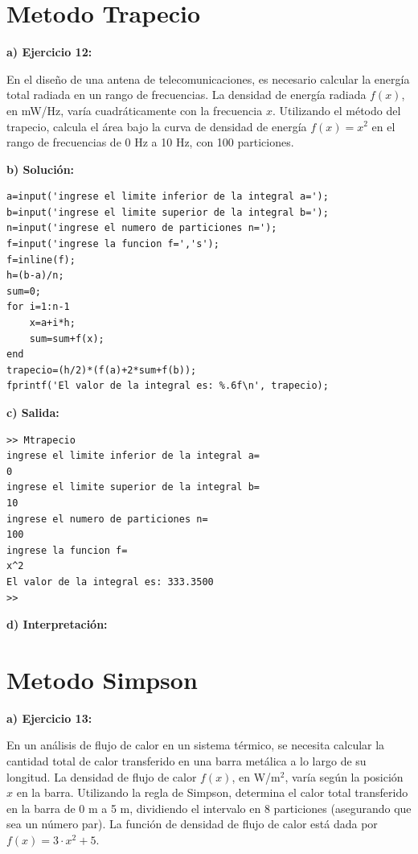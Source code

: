 \documentclass[12pt,a4paper,twoside]{article}  %
\begin{document}
\section{Metodo Trapecio}

\textbf{a) Ejercicio 12: }

En el diseño de una antena de telecomunicaciones, es necesario calcular la energía total radiada en un rango de frecuencias. La densidad de energía radiada \( f(x) \), en mW/Hz, varía cuadráticamente con la frecuencia \( x \). Utilizando el método del trapecio, calcula el área bajo la curva de densidad de energía \( f(x) = x^2 \) en el rango de frecuencias de 0 Hz a 10 Hz, con 100 particiones.

\textbf{b) Solución:}

\begin{lstlisting}
a=input('ingrese el limite inferior de la integral a=');
b=input('ingrese el limite superior de la integral b=');
n=input('ingrese el numero de particiones n=');
f=input('ingrese la funcion f=','s');
f=inline(f);
h=(b-a)/n;
sum=0;
for i=1:n-1
    x=a+i*h;
    sum=sum+f(x);
end
trapecio=(h/2)*(f(a)+2*sum+f(b));
fprintf('El valor de la integral es: %.6f\n', trapecio);
\end{lstlisting}

\textbf{c) Salida:}
\begin{verbatim}
>> Mtrapecio
ingrese el limite inferior de la integral a=
0
ingrese el limite superior de la integral b=
10
ingrese el numero de particiones n=
100
ingrese la funcion f=
x^2
El valor de la integral es: 333.3500
>> 
\end{verbatim}

\textbf{d) Interpretación:}

\section{Metodo Simpson}

\textbf{a) Ejercicio 13: }

En un análisis de flujo de calor en un sistema térmico, se necesita calcular la cantidad total de calor transferido en una barra metálica a lo largo de su longitud. La densidad de flujo de calor \( f(x) \), en W/m\(^2\), varía según la posición \( x \) en la barra. Utilizando la regla de Simpson, determina el calor total transferido en la barra de 0 m a 5 m, dividiendo el intervalo en 8 particiones (asegurando que sea un número par). La función de densidad de flujo de calor está dada por \( f(x) = 3 \cdot x^2 + 5 \).
\end{document}

